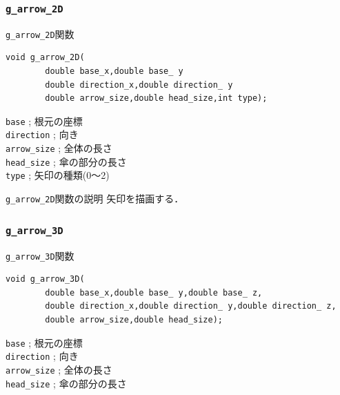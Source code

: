 \documentclass[a4paper,12pt]{jsarticle}%
\begin{document}
\clearpage
\subsubsection{\texttt{g\_arrow\_2D}}

\begin{itembox}[l]{\texttt{g\_arrow\_2D}関数}
\begin{verbatim}
void g_arrow_2D(
        double base_x,double base_ y
        double direction_x,double direction_ y
        double arrow_size,double head_size,int type);
\end{verbatim}
\verb|base| ; 根元の座標\\
\verb|direction| ; 向き\\
\verb|arrow_size| ; 全体の長さ\\
\verb|head_size| ; 傘の部分の長さ\\
\verb|type| ; 矢印の種類(0〜2)\\
\end{itembox}

\begin{itembox}[l]{\texttt{g\_arrow\_2D}関数の説明}
矢印を描画する．
\end{itembox}

\begin{figure}[htb]
\end{figure}




\clearpage
\subsubsection{\texttt{g\_arrow\_3D}}

\begin{itembox}[l]{\texttt{g\_arrow\_3D}関数}
\begin{verbatim}
void g_arrow_3D(
        double base_x,double base_ y,double base_ z,
        double direction_x,double direction_ y,double direction_ z,
        double arrow_size,double head_size);
\end{verbatim}
\verb|base| ; 根元の座標\\
\verb|direction| ; 向き\\
\verb|arrow_size| ; 全体の長さ\\
\verb|head_size| ; 傘の部分の長さ\\
\end{itembox}
\end{document}
